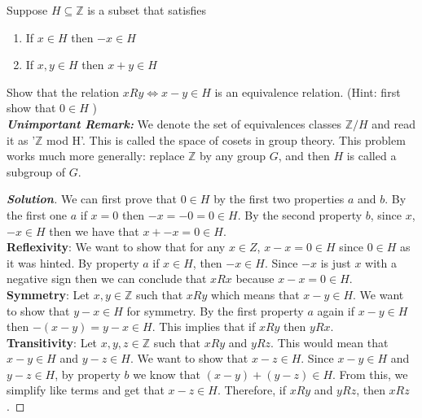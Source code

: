 \documentclass[11pt]{article}
\newenvironment{problem}[2][Problem\!]{\begin{trivlist}
\item[\hskip \labelsep {\bfseries #1}\hskip \labelsep {\bfseries #2.}]}{\end{trivlist}}
\newenvironment{solution}{\begin{proof}[\textbf{\textit{Solution}}]}{\end{proof}}
\newcommand{\zz}{\mathbb Z}   %
\begin{document}
\begin{problem}{7.2}
Suppose \(H \subseteq \zz\) is a subset that satisfies \begin{enumerate}
        \item [(a)] If \(x \in H\) then \(-x \in H\)
        \item [(b)] If \(x,y \in H\) then \(x+y \in H\)
    \end{enumerate} Show that the relation \(xRy \iff x-y \in H\) is an equivalence relation. (Hint: first show that \(0 \in H\) )\\
    \textbf{\textit{Unimportant Remark:}} We denote the set of equivalences classes \(\zz/H\) and read it as '\(\zz\) mod H'. This is called the space of cosets in group theory. This problem works much more generally: replace \(\zz\) by any group \(G\), and then \(H\) is called a subgroup of \(G\).
\begin{solution}
We can first prove that \(0 \in H\) by the first two properties \(a\) and \(b\). By the first one \(a\) if \(x = 0\) then \(-x = -0 = 0 \in H\). By the second property \(b\), since \(x\), \(-x \in H\) then we have that \(x + -x = 0 \in H\).\\
\textbf{Reflexivity}: We want to show that for any \(x \in Z\), \(x-x = 0 \in H\) since \(0 \in H\) as it was hinted. By property \(a\) if \(x \in H\), then \(-x \in H\). Since \(-x\) is just \(x\) with a negative sign then we can conclude that \(xRx\) because \(x - x = 0 \in H\).\\
\textbf{Symmetry}: Let \(x,y \in \mathbb{Z}\) such that \(xRy\) which means that \(x - y \in H\). We want to show that \(y-x \in H\) for symmetry. By the first property \(a\) again if \(x-y \in H\) then \(-(x-y) = y - x \in H\). This implies that if \(xRy\) then \(yRx\).\\
\textbf{Transitivity}: Let \(x,y,z \in \mathbb{Z}\) such that \(xRy\) and \(yRz\). This would mean that \(x-y \in H\) and \(y - z \in H\). We want to show that \(x - z \in H\). Since \(x-y \in H\) and \(y - z \in H\), by property \(b\) we know that \((x-y)+(y-z) \in H\). From this, we simplify like terms and get that \(x-z \in H\). Therefore, if \(xRy\) and \(yRz\), then \(xRz\).
\end{solution}


\end{problem}

\newpage  %
\end{document}
